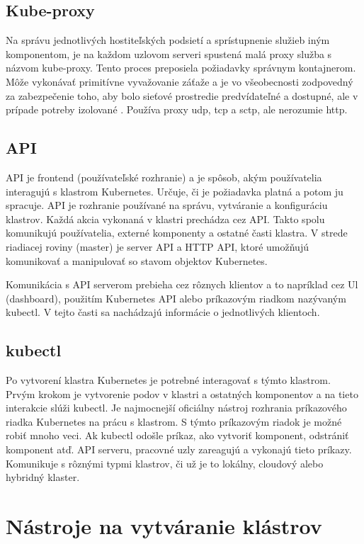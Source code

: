 \subsection*{Kube-proxy}
Na správu jednotlivých hostiteľských podsietí a sprístupnenie služieb iným komponentom, je na každom uzlovom serveri spustená malá proxy služba s názvom kube-proxy. Tento proces preposiela požiadavky správnym kontajnerom. Môže vykonávať primitívne vyvažovanie záťaže a je vo všeobecnosti zodpovedný za zabezpečenie toho, aby bolo sieťové prostredie predvídateľné a dostupné, ale v prípade potreby izolované \cite{kubeproxy}. Používa proxy \acrshort{udp}, \acrshort{tcp} a \acrshort{sctp}, ale nerozumie \acrshort{http}.

\subsection{API}

API je frontend (používateľské rozhranie) a je spôsob, akým používatelia interagujú s klastrom Kubernetes. Určuje, či je požiadavka platná a potom ju spracuje. API je rozhranie používané na správu, vytváranie a konfiguráciu klastrov. Každá akcia vykonaná v klastri prechádza cez API. Takto spolu komunikujú používatelia, externé komponenty a ostatné časti klastra. V strede riadiacej roviny (master) je server API a HTTP API, ktoré umožňujú komunikovať a manipulovať so stavom objektov Kubernetes.

Komunikácia s API serverom prebieha cez rôznych klientov a to napríklad cez Ul (dashboard), použitím Kubernetes API alebo príkazovým riadkom nazývaným kubectl. V tejto časti sa nachádzajú informácie o jednotlivých klientoch.

\subsection*{kubectl}

Po vytvorení klastra Kubernetes je potrebné interagovať s týmto klastrom. Prvým krokom je vytvorenie podov v klastri a ostatných komponentov a na tieto interakcie slúži kubectl. Je najmocnejší oficiálny nástroj rozhrania príkazového riadka Kubernetes na prácu s klastrom. S týmto príkazovým riadok je možné robiť mnoho veci. Ak kubectl odošle príkaz, ako vytvoriť komponent, odstrániť komponent atď. API serveru, pracovné uzly zareagujú a vykonajú tieto príkazy. Komunikuje s rôznými typmi klastrov, či už je to lokálny, cloudový alebo hybridný klaster.

\section{Nástroje na vytváranie klástrov}

